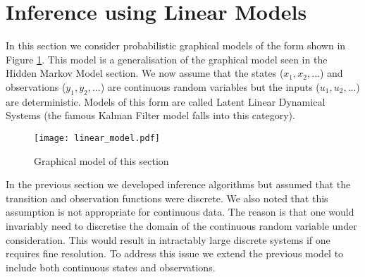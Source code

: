 \section{Inference using Linear Models}
\label{sec_inf_lin_mods}
In this section we consider probabilistic graphical models of the form shown in Figure \ref{fig_linmod2}. This model is a generalisation of the graphical model seen in the Hidden Markov Model section. We now assume that the states ($x_1,x_2,...$) and observations ($y_1,y_2,...$) are continuous random variables but the inputs ($u_1,u_2,...$) are deterministic. Models of this form are called Latent Linear Dynamical Systems (the famous Kalman Filter model falls into this category).
\begin{figure}[H] 
\centering
\texttt{[image: linear\_model.pdf]}
\caption{Graphical model of this section}
\label{fig_linmod2}
\end{figure}
In the previous section we developed inference algorithms but assumed that the transition and observation functions were discrete. We also noted that this assumption is not appropriate for continuous data. The reason is that one would invariably need to discretise the domain of the continuous random variable under consideration. This would result in intractably large discrete systems if one requires fine resolution. To address this issue we extend the previous model to include both continuous states and observations. 

